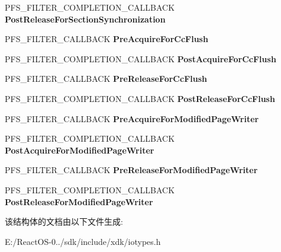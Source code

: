 \begin{DoxyCompactItemize}
P\+F\+S\+\_\+\+F\+I\+L\+T\+E\+R\+\_\+\+C\+O\+M\+P\+L\+E\+T\+I\+O\+N\+\_\+\+C\+A\+L\+L\+B\+A\+CK {\bfseries Post\+Release\+For\+Section\+Synchronization}
\item 
\mbox{\label{struct___f_s___f_i_l_t_e_r___c_a_l_l_b_a_c_k_s_a2bcc9e4bbd97e9e051926d52d9ccd247}} 
P\+F\+S\+\_\+\+F\+I\+L\+T\+E\+R\+\_\+\+C\+A\+L\+L\+B\+A\+CK {\bfseries Pre\+Acquire\+For\+Cc\+Flush}
\item 
\mbox{\label{struct___f_s___f_i_l_t_e_r___c_a_l_l_b_a_c_k_s_a3839a929a8d0cbfe1565d5ab4573207a}} 
P\+F\+S\+\_\+\+F\+I\+L\+T\+E\+R\+\_\+\+C\+O\+M\+P\+L\+E\+T\+I\+O\+N\+\_\+\+C\+A\+L\+L\+B\+A\+CK {\bfseries Post\+Acquire\+For\+Cc\+Flush}
\item 
\mbox{\label{struct___f_s___f_i_l_t_e_r___c_a_l_l_b_a_c_k_s_aaa19f0312cd711db0b14bc04d66d9146}} 
P\+F\+S\+\_\+\+F\+I\+L\+T\+E\+R\+\_\+\+C\+A\+L\+L\+B\+A\+CK {\bfseries Pre\+Release\+For\+Cc\+Flush}
\item 
\mbox{\label{struct___f_s___f_i_l_t_e_r___c_a_l_l_b_a_c_k_s_a4fc19b59658780d0a6f7d2d4743d47c7}} 
P\+F\+S\+\_\+\+F\+I\+L\+T\+E\+R\+\_\+\+C\+O\+M\+P\+L\+E\+T\+I\+O\+N\+\_\+\+C\+A\+L\+L\+B\+A\+CK {\bfseries Post\+Release\+For\+Cc\+Flush}
\item 
\mbox{\label{struct___f_s___f_i_l_t_e_r___c_a_l_l_b_a_c_k_s_ab254468c5ebd8cf0ac1bfeca73f2a5de}} 
P\+F\+S\+\_\+\+F\+I\+L\+T\+E\+R\+\_\+\+C\+A\+L\+L\+B\+A\+CK {\bfseries Pre\+Acquire\+For\+Modified\+Page\+Writer}
\item 
\mbox{\label{struct___f_s___f_i_l_t_e_r___c_a_l_l_b_a_c_k_s_a1b9920b3fc46b2afb6853e3597522ae5}} 
P\+F\+S\+\_\+\+F\+I\+L\+T\+E\+R\+\_\+\+C\+O\+M\+P\+L\+E\+T\+I\+O\+N\+\_\+\+C\+A\+L\+L\+B\+A\+CK {\bfseries Post\+Acquire\+For\+Modified\+Page\+Writer}
\item 
\mbox{\label{struct___f_s___f_i_l_t_e_r___c_a_l_l_b_a_c_k_s_a752cd75fc60b019528571ffddcdadd42}} 
P\+F\+S\+\_\+\+F\+I\+L\+T\+E\+R\+\_\+\+C\+A\+L\+L\+B\+A\+CK {\bfseries Pre\+Release\+For\+Modified\+Page\+Writer}
\item 
\mbox{\label{struct___f_s___f_i_l_t_e_r___c_a_l_l_b_a_c_k_s_af4ef1fbbf9aaa276a375ac55bf22c46f}} 
P\+F\+S\+\_\+\+F\+I\+L\+T\+E\+R\+\_\+\+C\+O\+M\+P\+L\+E\+T\+I\+O\+N\+\_\+\+C\+A\+L\+L\+B\+A\+CK {\bfseries Post\+Release\+For\+Modified\+Page\+Writer}
\end{DoxyCompactItemize}


该结构体的文档由以下文件生成\+:\begin{DoxyCompactItemize}
\item 
E\+:/\+React\+O\+S-\/0../sdk/include/xdk/iotypes.\+h\end{DoxyCompactItemize}
